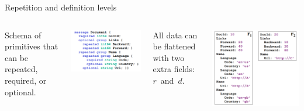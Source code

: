 \documentclass{beamer}
\begin{document}
\begin{frame}{Repetition and definition levels}
\vspace{0.5 cm}
\begin{columns}[T]
\small Schema of primitives that can be repeated, required, or optional.

\vspace{0.2 cm}
\includegraphics[width=\linewidth]{repetition_and_definition_schema.png}

\vspace{0.1 cm}
All data can be flattened with two extra fields: \mbox{$r$ and $d$.\hspace{-1 cm}}

\vspace{-0.2 cm}

\includegraphics[width=\linewidth]{repetition_and_definition_data.png}
\end{columns}


\end{frame}
\end{document}
